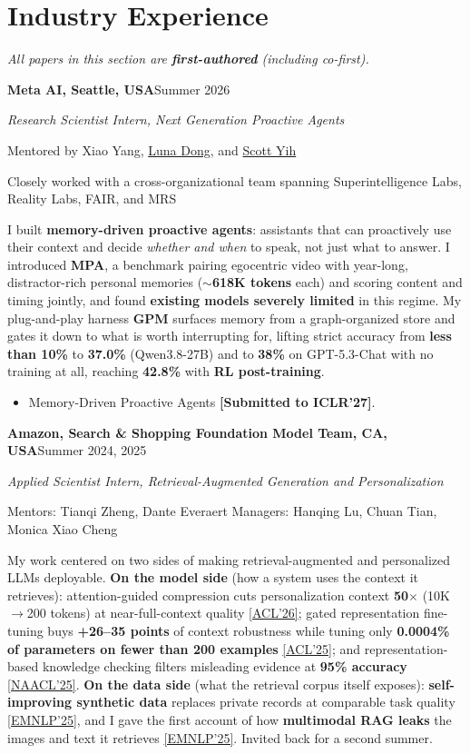 \documentclass[12pt,letterpaper]{article}
\newcommand{\entry}[2]{\textbf{#1}\hfill #2\par}
\newcommand{\role}[1]{\textit{#1}\par}
\newcommand{\meta}[1]{{\small #1}\par}
\newcommand{\blurb}[1]{\vspace{0.25em}\par #1\par\vspace{0.25em}}
\begin{document}
\section{Industry Experience}
\textit{All papers in this section are \textbf{first-authored} (including co-first).}\par\vspace{0.4em}
\entry{Meta AI, Seattle, USA}{Summer 2026}
\role{Research Scientist Intern, Next Generation Proactive Agents}
\meta{Mentored by Xiao Yang, \href{https://lunadong.com/}{Luna Dong}, and \href{https://scottyih.org/}{Scott Yih}}
\meta{Closely worked with a cross-organizational team spanning Superintelligence Labs, Reality Labs, FAIR, and MRS}
\blurb{I built \textbf{memory-driven proactive agents}: assistants that can proactively use their context and decide \emph{whether and when} to speak, not just what to answer. I introduced \textbf{MPA}, a benchmark pairing egocentric video with year-long, distractor-rich personal memories (\textbf{$\sim$618K tokens} each) and scoring content and timing jointly, and found \textbf{existing models severely limited} in this regime. My plug-and-play harness \textbf{GPM} surfaces memory from a graph-organized store and gates it down to what is worth interrupting for, lifting strict accuracy from \textbf{less than 10\%} to \textbf{37.0\%} (Qwen3.8-27B) and to \textbf{38\%} on GPT-5.3-Chat with no training at all, reaching \textbf{42.8\%} with \textbf{RL post-training}.}
\begin{itemize}
  \item Memory-Driven Proactive Agents \textbf{[Submitted to ICLR'27]}.
\end{itemize}
\vspace{0.5em}
\entry{Amazon, Search \& Shopping Foundation Model Team, CA, USA}{Summer 2024, 2025}
\role{Applied Scientist Intern, Retrieval-Augmented Generation and Personalization}
\meta{Mentors: Tianqi Zheng, Dante Everaert \quad\textbar\quad Managers: Hanqing Lu, Chuan Tian, Monica Xiao Cheng}
\blurb{My work centered on two sides of making retrieval-augmented and personalized LLMs deployable. \textbf{On the model side} (how a system uses the context it retrieves): attention-guided compression cuts personalization context \textbf{50$\times$} (10K$\rightarrow$200 tokens) at near-full-context quality \href{https://arxiv.org/abs/2602.07778}{[ACL'26]}; gated representation fine-tuning buys \textbf{+26--35 points} of context robustness while tuning only \textbf{0.0004\% of parameters on fewer than 200 examples} \href{https://arxiv.org/abs/2502.14100}{[ACL'25]}; and representation-based knowledge checking filters misleading evidence at \textbf{95\% accuracy} \href{https://arxiv.org/abs/2411.14572}{[NAACL'25]}. \textbf{On the data side} (what the retrieval corpus itself exposes): \textbf{self-improving synthetic data} replaces private records at comparable task quality \href{https://arxiv.org/abs/2406.14773}{[EMNLP'25]}, and I gave the first account of how \textbf{multimodal RAG leaks} the images and text it retrieves \href{https://arxiv.org/abs/2505.13957}{[EMNLP'25]}. Invited back for a second summer.}
\end{document}
